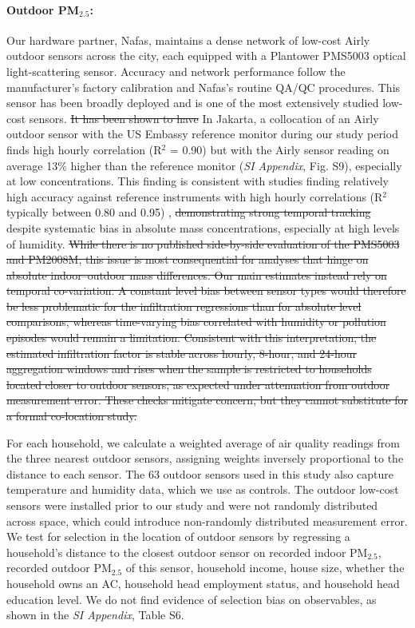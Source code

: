 \documentclass[9pt,twocolumn,twoside]{pnas-new}
\providecommand{\DIFadd}[1]{{\protect\color{red}#1}}
\providecommand{\DIFdel}[1]{{\protect\color{red}\protect\sout{#1}}}
\begin{document}
\paragraph{Outdoor PM$_{2.5}$:} Our hardware partner, Nafas, maintains a dense network of low-cost Airly outdoor sensors across the city, each equipped with a Plantower PMS5003 optical light-scattering sensor. Accuracy and network performance follow the manufacturer’s factory calibration and Nafas’s routine QA/QC procedures. This sensor has been broadly deployed and is one of the most extensively studied low-cost sensors. \DIFdel{It has been shown to have} \DIFadd{In Jakarta, a collocation of an Airly outdoor sensor with the US Embassy reference monitor during our study period finds high hourly correlation (R$^2$ = 0.90) but with the Airly sensor reading on average 13\% higher than the reference monitor (}\textit{\DIFadd{SI Appendix}}\DIFadd{, Fig. S9), especially at low concentrations. This finding is consistent with studies finding} relatively high accuracy against reference instruments with high hourly correlations (R$^2$ typically between 0.80 and 0.95) \citep{Sayahi2019, Zheng2018}, \DIFdel{demonstrating strong temporal tracking} despite systematic bias in absolute mass concentrations, especially at high levels of humidity.
\DIFdel{While there is no published side-by-side evaluation of the PMS5003 and PM2008M, this issue is most consequential for analyses that hinge on absolute indoor–outdoor mass differences. Our main estimates instead rely on temporal co-variation. A constant level bias between sensor types would therefore be less problematic for the infiltration regressions than for absolute level comparisons, whereas time-varying bias correlated with humidity or pollution episodes would remain a limitation. Consistent with this interpretation, the estimated infiltration factor is stable across hourly, 8-hour, and 24-hour aggregation windows and rises when the sample is restricted to households located closer to outdoor sensors, as expected under attenuation from outdoor measurement error. These checks mitigate concern, but they cannot substitute for a formal co-location study.}

 

For each household, we calculate a weighted average of air quality readings from the three nearest outdoor sensors, assigning weights inversely proportional to the distance to each sensor. The 63 outdoor sensors used in this study also capture temperature and humidity data, which we use as controls. The outdoor low-cost sensors were installed prior to our study and were not randomly distributed across space, which could introduce non-randomly distributed measurement error. We test for selection in the location of outdoor sensors by regressing a household's distance to the closest outdoor sensor on recorded indoor PM$_{2.5}$, recorded outdoor PM$_{2.5}$ of this sensor, household income, house size, whether the household owns an AC, household head employment status, and household head education level. We do not find evidence of selection bias on observables, as shown in the \textit{SI Appendix}, Table S6.
\end{document}
